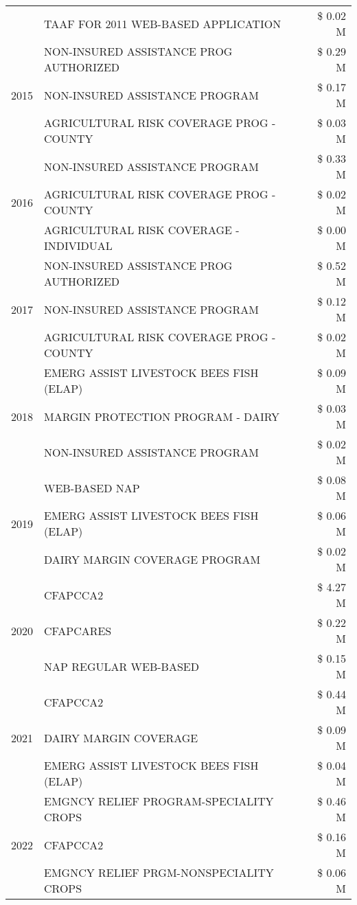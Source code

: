 \begin{tabular}{llr}
 & TAAF FOR 2011 WEB-BASED APPLICATION & \$ 0.02 M \\
\cline{1-3}
\multirow[t]{3}{*}{2015} & NON-INSURED ASSISTANCE PROG AUTHORIZED & \$ 0.29 M \\
 & NON-INSURED ASSISTANCE PROGRAM & \$ 0.17 M \\
 & AGRICULTURAL RISK COVERAGE PROG - COUNTY & \$ 0.03 M \\
\cline{1-3}
\multirow[t]{3}{*}{2016} & NON-INSURED ASSISTANCE PROGRAM & \$ 0.33 M \\
 & AGRICULTURAL RISK COVERAGE PROG - COUNTY & \$ 0.02 M \\
 & AGRICULTURAL RISK COVERAGE - INDIVIDUAL & \$ 0.00 M \\
\cline{1-3}
\multirow[t]{3}{*}{2017} & NON-INSURED ASSISTANCE PROG AUTHORIZED & \$ 0.52 M \\
 & NON-INSURED ASSISTANCE PROGRAM & \$ 0.12 M \\
 & AGRICULTURAL RISK COVERAGE PROG - COUNTY & \$ 0.02 M \\
\cline{1-3}
\multirow[t]{3}{*}{2018} & EMERG ASSIST LIVESTOCK BEES FISH (ELAP) & \$ 0.09 M \\
 & MARGIN PROTECTION PROGRAM - DAIRY & \$ 0.03 M \\
 & NON-INSURED ASSISTANCE PROGRAM & \$ 0.02 M \\
\cline{1-3}
\multirow[t]{3}{*}{2019} & WEB-BASED NAP & \$ 0.08 M \\
 & EMERG ASSIST LIVESTOCK BEES FISH (ELAP) & \$ 0.06 M \\
 & DAIRY MARGIN COVERAGE PROGRAM & \$ 0.02 M \\
\cline{1-3}
\multirow[t]{3}{*}{2020} & CFAPCCA2 & \$ 4.27 M \\
 & CFAPCARES & \$ 0.22 M \\
 & NAP REGULAR WEB-BASED & \$ 0.15 M \\
\cline{1-3}
\multirow[t]{3}{*}{2021} & CFAPCCA2 & \$ 0.44 M \\
 & DAIRY MARGIN COVERAGE & \$ 0.09 M \\
 & EMERG ASSIST LIVESTOCK BEES FISH (ELAP) & \$ 0.04 M \\
\cline{1-3}
\multirow[t]{3}{*}{2022} & EMGNCY RELIEF PROGRAM-SPECIALITY CROPS & \$ 0.46 M \\
 & CFAPCCA2 & \$ 0.16 M \\
 & EMGNCY RELIEF PRGM-NONSPECIALITY CROPS & \$ 0.06 M \\
\cline{1-3}
\bottomrule
\end{tabular}
